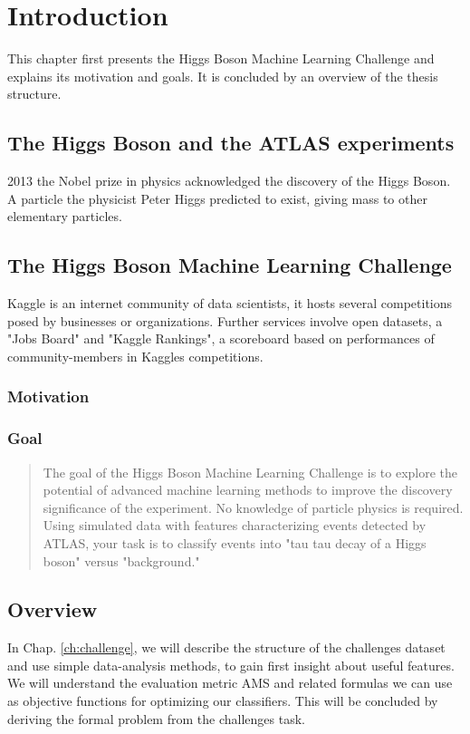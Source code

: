 \section{Introduction}\label{ch:intro}\raggedbottom

This chapter first presents the Higgs Boson Machine Learning Challenge and explains its motivation and goals. It is concluded by an overview of the thesis structure.

\subsection{The Higgs Boson and the ATLAS experiments}
2013 the Nobel prize in physics acknowledged the discovery of the Higgs Boson. A particle the physicist Peter Higgs predicted to exist, giving mass to other elementary particles. 

\subsection{The Higgs Boson Machine Learning Challenge}
Kaggle is an internet community of data scientists, it hosts several competitions posed by businesses or organizations. Further services involve open datasets, a "Jobs Board" and "Kaggle Rankings", a scoreboard based on performances of community-members in Kaggles competitions.

\subsubsection{Motivation}


\subsubsection{Goal}

\begin{quote}
The goal of the Higgs Boson Machine Learning Challenge is to explore the potential of advanced machine learning methods to improve the discovery significance of the experiment. No knowledge of particle physics is required. Using simulated data with features characterizing events detected by ATLAS, your task is to classify events into "tau tau decay of a Higgs boson" versus "background."
\cite{higgsChallenge}
\end{quote}

\subsection{Overview}
In Chap. \ref{ch:challenge}, we will describe the structure of the challenges dataset \cite{higgsData} and use simple data-analysis methods, to gain first insight about useful features.
We will understand the evaluation metric AMS and related formulas we can use as objective functions for optimizing our classifiers. 
This will be concluded by deriving the formal problem from the challenges task. 

